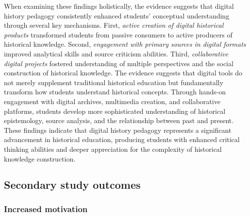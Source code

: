 \documentclass[
hf,
]{ceurart}
\begin{document}
When examining these findings holistically, the evidence suggests that digital history pedagogy consistently enhanced students' conceptual understanding through several key mechanisms. First, \textit{active creation of digital historical products} transformed students from passive consumers to active producers of historical knowledge. Second, \textit{engagement with primary sources in digital formats} improved analytical skills and source criticism abilities. Third, \textit{collaborative digital projects} fostered understanding of multiple perspectives and the social construction of historical knowledge. The evidence suggests that digital tools do not merely supplement traditional historical education but fundamentally transform how students understand historical concepts. Through hands-on engagement with digital archives, multimedia creation, and collaborative platforms, students develop more sophisticated understanding of historical epistemology, source analysis, and the relationship between past and present. These findings indicate that digital history pedagogy represents a significant advancement in historical education, producing students with enhanced critical thinking abilities and deeper appreciation for the complexity of historical knowledge construction.


\subsection{Secondary study outcomes}
\subsubsection{Increased motivation}

\end{document}

